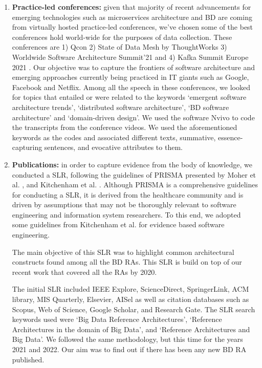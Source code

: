 \documentclass[review]{elsarticle}
\begin{document}
\begin{enumerate}
    \item{\bf{Practice-led conferences:}} given that majority of recent advancements for emerging technologies such as microservices architecture \cite{gan2019open, laigner2021data, laigner2021data} and BD are coming from virtually hosted practice-led conferences, we've chosen some of the best conferences hold world-wide for the purposes of data collection. These conferences are 1) Qcon \cite{QCON} 2) State of Data Mesh by ThoughtWorks \cite{ThoughtWorks} 3) Worldwide Software Architecture Summit'21 \cite{Geekle} and 4) Kafka Summit Europe 2021 \cite{KafkaSummit}. Our objective was to capture the frontiers of software architecture and emerging approaches currently being practiced in IT giants such as Google, Facebook and Netflix. Among all the speech in these conferences, we looked for topics that entailed or were related to the keywords `emergent software architecture trends', `distributed software architecture', `BD software architecture' and `domain-driven design'. We used the software Nvivo to code the transcripts from the conference videos. We used the aforementioned keywords as the codes and associated different texts, summative, essence-capturing sentences, and evocative attributes to them.
    
    \item{\bf{Publications:}} in order to capture evidence from the body of knowledge, we conducted a SLR, following the guidelines of PRISMA presented by Moher et al. \cite{moher2015preferred}, and Kitchenham et al. \cite{kitchenham2015evidence}. Although PRISMA is a comprehensive guidelines for conducting a SLR, it is derived from the healthcare community and is driven by assumptions that may not be thoroughly relevant to software engineering and information system researchers. To this end, we adopted some guidelines from Kitchenham et al. for evidence based software engineering.
    
    The main objective of this SLR was to highlight common architectural constructs found among all the BD RAs. This SLR is build on top of our recent work \cite{AtaeiACIS} that covered all the RAs by 2020.

    The initial SLR included IEEE Explore, ScienceDirect, SpringerLink, ACM library, MIS Quarterly, Elsevier, AISel as well as citation databases such as Scopus, Web of Science, Google Scholar, and Research Gate. The SLR search keywords used were `Big Data Reference Architectures’, `Reference Architectures in the domain of Big Data’, and `Reference Architectures and Big Data’. We followed the same methodology, but this time for the years 2021 and 2022. Our aim was to find out if there has been any new BD RA published.


\end{enumerate}
\end{document}
